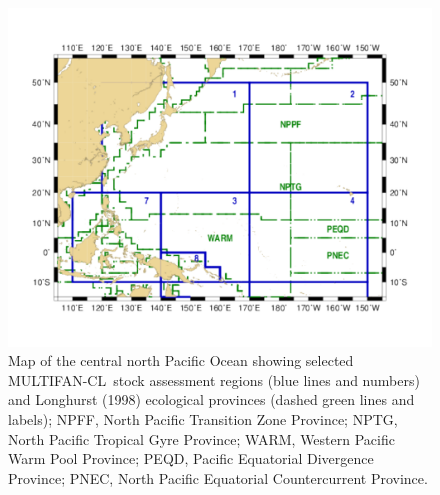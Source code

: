\documentclass[12pt,letterpaper]{article}
\newcommand\MFCL{MULTIFAN-CL}
\begin{document}
\begin{figure}
\begin{center}
\includegraphics[height=0.45\textheight]{./paczones.pdf}
\caption{Map of the central north Pacific Ocean showing selected \MFCL\
stock assessment regions (blue lines and numbers) and 
Longhurst (1998) ecological provinces (dashed green lines and labels);
NPFF, North Pacific Transition Zone Province;
NPTG, North Pacific Tropical Gyre Province;
WARM, Western Pacific Warm Pool Province;
PEQD, Pacific Equatorial Divergence Province;
PNEC, North Pacific Equatorial Countercurrent Province.
\label{fig:paczones}}
\end{center}
\end{figure}
\end{document}
